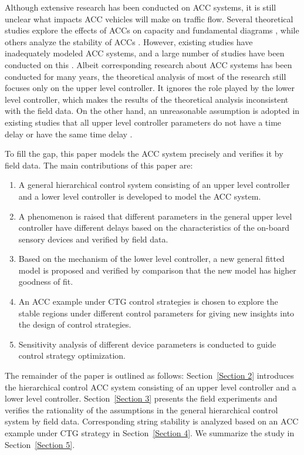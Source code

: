 \documentclass[a4paper]{cas-sc}
\begin{document}
Although extensive research has been conducted on ACC systems, it is still unclear what impacts ACC vehicles will make on traffic flow. Several theoretical studies explore the effects of ACCs on capacity and fundamental diagrams \citep{Shang2021,Li2022,Ciuffo2021}, while others analyze the stability of ACCs \citep{Flores2018,Lee2021,Zhou2017}. However, existing studies have inadequately modeled ACC systems, and a large number of studies have been conducted on this \citep{Gunter2019,Shang2022,Milanes2014}. Albeit corresponding research about ACC systems has been conducted for many years, the theoretical analysis of most of the research still focuses only on the upper level controller. It ignores the role played by the lower level controller, which makes the results of the theoretical analysis inconsistent with the field data. On the other hand, an unreasonable assumption is adopted in existing studies that all upper level controller parameters do not have a time delay or have the same time delay \citep{Ngoduy2013,Zhou2019}.

To fill the gap, this paper models the ACC system precisely and verifies it by field data. The main contributions of this paper are:

\begin{enumerate}
  \item A general hierarchical control system consisting of an upper level controller and a lower level controller is developed to model the ACC system.
  \item A phenomenon is raised that different parameters in the general upper level controller have different delays based on the characteristics of the on-board sensory devices and verified by field data.
  \item Based on the mechanism of the lower level controller, a new general fitted model is proposed and verified by comparison that the new model has higher goodness of fit.
  \item An ACC example under CTG control strategies is chosen to explore the stable regions under different control parameters for giving new insights into the design of control strategies.
  \item Sensitivity analysis of different device parameters is conducted to guide control strategy optimization.
\end{enumerate}

The remainder of the paper is outlined as follows: Section~\ref{Section 2} introduces the hierarchical control ACC system consisting of an upper level controller and a lower level controller. Section~\ref{Section 3} presents the field experiments and verifies the rationality of the assumptions in the general hierarchical control system by field data. Corresponding string stability is analyzed based on an ACC example under CTG strategy in Section~\ref{Section 4}. We summarize the study in Section~\ref{Section 5}.
\end{document}

